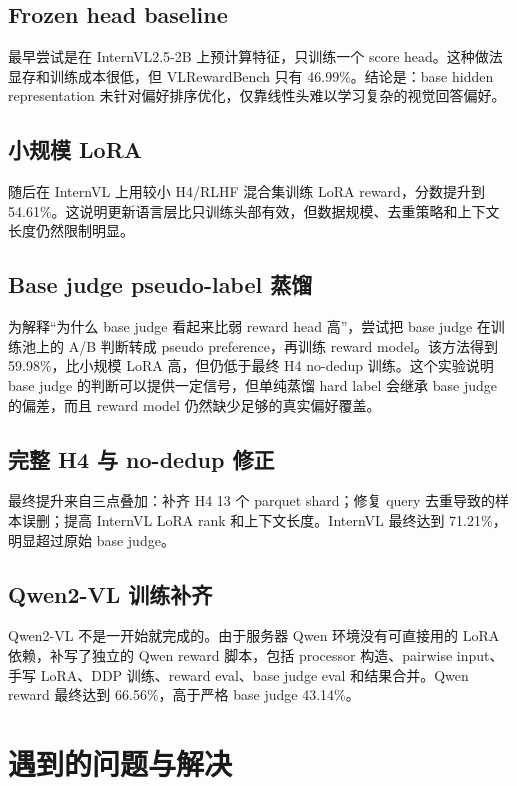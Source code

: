 \documentclass[11pt]{article}
\begin{document}
\subsection{Frozen head baseline}

最早尝试是在 InternVL2.5-2B 上预计算特征，只训练一个 score head。这种做法显存和训练成本很低，但 VLRewardBench 只有 46.99\%。结论是：base hidden representation 未针对偏好排序优化，仅靠线性头难以学习复杂的视觉回答偏好。

\subsection{小规模 LoRA}

随后在 InternVL 上用较小 H4/RLHF 混合集训练 LoRA reward，分数提升到 54.61\%。这说明更新语言层比只训练头部有效，但数据规模、去重策略和上下文长度仍然限制明显。

\subsection{Base judge pseudo-label 蒸馏}

为解释“为什么 base judge 看起来比弱 reward head 高”，尝试把 base judge 在训练池上的 A/B 判断转成 pseudo preference，再训练 reward model。该方法得到 59.98\%，比小规模 LoRA 高，但仍低于最终 H4 no-dedup 训练。这个实验说明 base judge 的判断可以提供一定信号，但单纯蒸馏 hard label 会继承 base judge 的偏差，而且 reward model 仍然缺少足够的真实偏好覆盖。

\subsection{完整 H4 与 no-dedup 修正}

最终提升来自三点叠加：补齐 H4 13 个 parquet shard；修复 query 去重导致的样本误删；提高 InternVL LoRA rank 和上下文长度。InternVL 最终达到 71.21\%，明显超过原始 base judge。

\subsection{Qwen2-VL 训练补齐}

Qwen2-VL 不是一开始就完成的。由于服务器 Qwen 环境没有可直接用的 LoRA 依赖，补写了独立的 Qwen reward 脚本，包括 processor 构造、pairwise input、手写 LoRA、DDP 训练、reward eval、base judge eval 和结果合并。Qwen reward 最终达到 66.56\%，高于严格 base judge 43.14\%。

\section{遇到的问题与解决}
\end{document}

